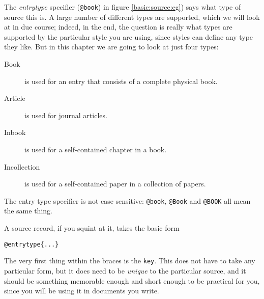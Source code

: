 The \emph{entrytype} specifier (\verb|@book|) in figure
\ref{basic:source:eg}) says what type of source this is. A large
number of different types are supported, which we will look at in due
course; indeed, in the end, the question is really what types are
supported by the particular style you are using, since styles can
define any type they like. But in this chapter we are going to look at
just four types:
\begin{description}
\item[Book] is used for an entry that consists of a complete physical
  book.
\item[Article] is used for journal articles.
\item[Inbook] is used for a self-contained chapter in a
  book.
\item[Incollection] is used for a self-contained paper in a collection
  of papers.
\end{description}

The entry type specifier is not case sensitive: \verb|@book|,
\verb|@Book| and \verb|@BOOK| all mean the same thing.

A source record, if you squint at it, takes the basic form
\begin{center}\verb|@entrytype{...}|\end{center}The very first thing
within the braces is the \verb|key|. This does not have to take any
particular form, but it does need to be \emph{unique} to the
particular source, and it should be something memorable enough and
short enough to be practical for you, since you will be using it in
documents you write.

